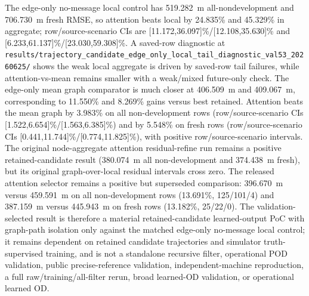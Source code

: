 \documentclass{article}
\begin{document}
The edge-only no-message local control has 519.282~m all-nondevelopment and 706.730~m fresh RMSE, so attention beats local by 24.835\% and 45.329\% in aggregate; row/source-scenario CIs are [11.172,36.097]\%/[12.108,35.630]\% and [6.233,61.137]\%/[23.030,59.308]\%. A saved-row diagnostic at \nolinkurl{results/trajectory_candidate_edge_only_local_tail_diagnostic_val53_20260625/} shows the weak local aggregate is driven by saved-row tail failures, while attention-vs-mean remains smaller with a weak/mixed future-only check. The edge-only mean graph comparator is much closer at 406.509~m and 409.067~m, corresponding to 11.550\% and 8.269\% gains versus best retained. Attention beats the mean graph by 3.983\% on all non-development rows (row/source-scenario CIs [1.522,6.654]\%/[1.563,6.385]\%) and by 5.548\% on fresh rows (row/source-scenario CIs [0.441,11.744]\%/[0.774,11.825]\%), with positive row/source-scenario intervals. The original node-aggregate attention residual-refine run remains a positive retained-candidate result (380.074~m all non-development and 374.438~m fresh), but its original graph-over-local residual intervals cross zero. The released attention selector remains a positive but superseded comparison: 396.670~m versus 459.591~m on all non-development rows (13.691\%, 125/101/4) and 387.159~m versus 445.943~m on fresh rows (13.182\%, 25/22/0). The validation-selected result is therefore a material retained-candidate learned-output PoC with graph-path isolation only against the matched edge-only no-message local control; it remains dependent on retained candidate trajectories and simulator truth-supervised training, and is not a standalone recursive filter, operational POD validation, public precise-reference validation, independent-machine reproduction, a full raw/training/all-filter rerun, broad learned-OD validation, or operational learned OD.
\end{document}
